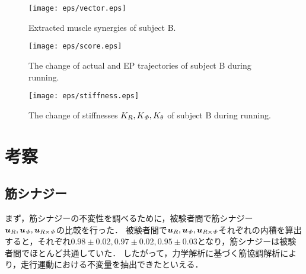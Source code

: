 %
\begin{figure}[!t]
 \begin{center}
  \texttt{[image: eps/vector.eps]}
  \caption{Extracted muscle synergies of subject B.}
  \label{vector}
 \end{center}
\end{figure}
%
\begin{figure}[!t]
 \begin{center}
  \texttt{[image: eps/score.eps]}
  \caption{The change of actual and EP trajectories of subject B during running.}
  \label{score}
 \end{center}
\end{figure}
%
\begin{figure}[!t]
 \begin{center}
  \texttt{[image: eps/stiffness.eps]}
  \caption{The change of stiffnesses $K_R,K_{\it \Phi},K_\theta$ of subject B during running.}
  \label{stiffness}
 \end{center}
\end{figure}
%
\clearpage
\section{考察}

\subsection{筋シナジー}
まず，筋シナジーの不変性を調べるために，被験者間で筋シナジー$\mbox{\boldmath $u$}_R,\mbox{\boldmath $u$}_{\it \Phi},\mbox{\boldmath $u$}_{R\times{\it \Phi}}$の比較を行った．
被験者間で$\mbox{\boldmath $u$}_R,\mbox{\boldmath $u$}_{\it \Phi},\mbox{\boldmath $u$}_{R\times{\it \Phi}}$それぞれの内積を算出すると，それぞれ$0.98\pm0.02,0.97\pm0.02,0.95\pm0.03$となり，筋シナジーは被験者間でほとんど共通していた．
したがって，力学解析に基づく筋協調解析により，走行運動における不変量を抽出できたといえる．

